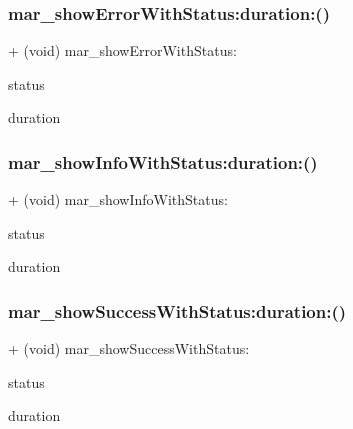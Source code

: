 \subsubsection{\texorpdfstring{mar\+\_\+show\+Error\+With\+Status\+:duration\+:()}{mar\_showErrorWithStatus:duration:()}}
{\footnotesize\ttfamily + (void) mar\+\_\+show\+Error\+With\+Status\+: \begin{DoxyParamCaption}\item[{(N\+S\+String$\ast$)}]{status }\item[{duration:(C\+G\+Float)}]{duration }\end{DoxyParamCaption}}

\mbox{\label{interface_s_v_progress_h_u_d_a352dd25a4e227cb05fd76b00c1b397ae}} 
\subsubsection{\texorpdfstring{mar\+\_\+show\+Info\+With\+Status\+:duration\+:()}{mar\_showInfoWithStatus:duration:()}}
{\footnotesize\ttfamily + (void) mar\+\_\+show\+Info\+With\+Status\+: \begin{DoxyParamCaption}\item[{(N\+S\+String$\ast$)}]{status }\item[{duration:(C\+G\+Float)}]{duration }\end{DoxyParamCaption}}

\mbox{\label{interface_s_v_progress_h_u_d_ae491ec01660d2a0315fc1ea6762e330f}} 
\subsubsection{\texorpdfstring{mar\+\_\+show\+Success\+With\+Status\+:duration\+:()}{mar\_showSuccessWithStatus:duration:()}}
{\footnotesize\ttfamily + (void) mar\+\_\+show\+Success\+With\+Status\+: \begin{DoxyParamCaption}\item[{(N\+S\+String$\ast$)}]{status }\item[{duration:(C\+G\+Float)}]{duration }\end{DoxyParamCaption}}



